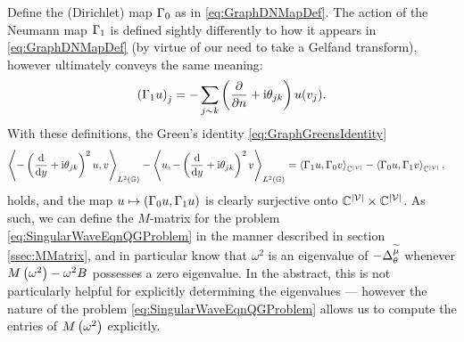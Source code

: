 Define the (Dirichlet) map $\Gamma_0$ as in \eqref{eq:GraphDNMapDef}.
The action of the Neumann map $\Gamma_1$ is defined sightly differently to how it appears in \eqref{eq:GraphDNMapDef} (by virtue of our need to take a Gelfand transform), however ultimately conveys the same meaning:
\begin{align} \label{eq:GraphNMapQM}
	\left( \Gamma_1 u \right)_j = -\sum_{j\sim k} \left( \dfrac{\partial }{\partial n} + \mathrm{i}\theta_{jk}  \right)u(v_j).
\end{align}
With these definitions, the Green's identity \eqref{eq:GraphGreensIdentity} 
\begin{align*}
	\left\langle  -\left( \dfrac{\mathrm{d}}{\mathrm{d}y}+\mathrm{i}\theta_{jk} \right)^2 u  ,  v  \right\rangle_{L^2\left( \mathbb{G} \right)} - \left\langle  u  ,  -\left( \dfrac{\mathrm{d}}{\mathrm{d}y}+\mathrm{i}\theta_{jk} \right)^2 v  \right\rangle_{L^2\left( \mathbb{G} \right)}
	&= \left\langle \Gamma_1 u , \Gamma_0 v \right\rangle_{\mathbb{C}^{\left\lvert \mathcal{V} \right\rvert}} - \left\langle \Gamma_0 u , \Gamma_1 v \right\rangle_{\mathbb{C}^{\left\lvert \mathcal{V} \right\rvert}},
\end{align*}
holds, and the map $u\mapsto\left( \Gamma_0 u, \Gamma_1 u \right)$ is clearly surjective onto $\mathbb{C}^{\left\lvert \mathcal{V} \right\rvert}\times\mathbb{C}^{\left\lvert \mathcal{V} \right\rvert}$.
As such, we can define the $M$-matrix for the problem \eqref{eq:SingularWaveEqnQGProblem} in the manner described in section \ref{ssec:MMatrix}, and in particular know that $\omega^2$ is an eigenvalue of $-\Delta_{\theta}^{\widetilde{\mu}}$ whenever $M\left( \omega^2 \right)-\omega^2 B$ possesses a zero eigenvalue.
In the abstract, this is not particularly helpful for explicitly determining the eigenvalues --- however the nature of the problem \eqref{eq:SingularWaveEqnQGProblem} allows us to compute the entries of $M\left( \omega^2 \right)$ explicitly.

